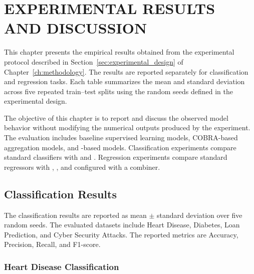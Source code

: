 \chapter{EXPERIMENTAL RESULTS AND DISCUSSION}
\label{ch:experimental_results_and_discussion}

\hs This chapter presents the empirical results obtained from the experimental protocol described in Section~\ref{sec:experimental_design} of Chapter~\ref{ch:methodology}. The results are reported separately for classification and regression tasks. Each table summarizes the mean and standard deviation across five repeated train--test splits using the random seeds defined in the experimental design.

The objective of this chapter is to report and discuss the observed model behavior without modifying the numerical outputs produced by the experiment. The evaluation includes baseline supervised learning models, COBRA-based aggregation models, and \KFCProcedure{}-based models. Classification experiments compare standard classifiers with  and . Regression experiments compare standard regressors with , , and  configured with a  combiner.

\section{Classification Results}
\label{sec:classification_results}

\hs The classification results are reported as mean $\pm$ standard deviation over five random seeds. The evaluated datasets include Heart Disease, Diabetes, Loan Prediction, and Cyber Security Attacks. The reported metrics are Accuracy, Precision, Recall, and F1-score.

\subsection{Heart Disease Classification}

